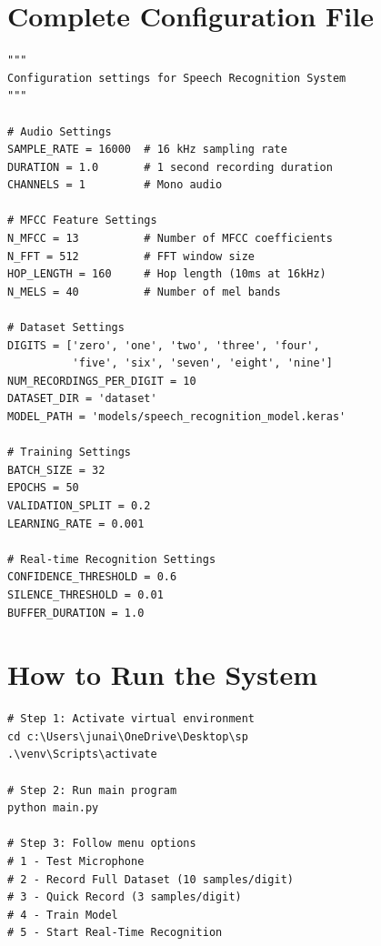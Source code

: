 \documentclass[a4paper,12pt]{article}
\begin{document}
\appendix
\section{Complete Configuration File}
\begin{lstlisting}[style=pythonstyle]
"""
Configuration settings for Speech Recognition System
"""

# Audio Settings
SAMPLE_RATE = 16000  # 16 kHz sampling rate
DURATION = 1.0       # 1 second recording duration
CHANNELS = 1         # Mono audio

# MFCC Feature Settings
N_MFCC = 13          # Number of MFCC coefficients
N_FFT = 512          # FFT window size
HOP_LENGTH = 160     # Hop length (10ms at 16kHz)
N_MELS = 40          # Number of mel bands

# Dataset Settings
DIGITS = ['zero', 'one', 'two', 'three', 'four', 
          'five', 'six', 'seven', 'eight', 'nine']
NUM_RECORDINGS_PER_DIGIT = 10
DATASET_DIR = 'dataset'
MODEL_PATH = 'models/speech_recognition_model.keras'

# Training Settings
BATCH_SIZE = 32
EPOCHS = 50
VALIDATION_SPLIT = 0.2
LEARNING_RATE = 0.001

# Real-time Recognition Settings
CONFIDENCE_THRESHOLD = 0.6
SILENCE_THRESHOLD = 0.01
BUFFER_DURATION = 1.0
\end{lstlisting}

\section{How to Run the System}
\begin{verbatim}
# Step 1: Activate virtual environment
cd c:\Users\junai\OneDrive\Desktop\sp
.\venv\Scripts\activate

# Step 2: Run main program
python main.py

# Step 3: Follow menu options
# 1 - Test Microphone
# 2 - Record Full Dataset (10 samples/digit)
# 3 - Quick Record (3 samples/digit)
# 4 - Train Model
# 5 - Start Real-Time Recognition
\end{verbatim}
\end{document}
